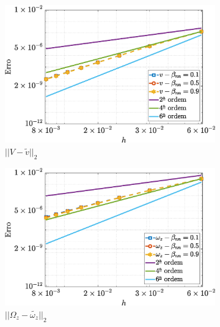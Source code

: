 \begin{figure}[H]
\begin{subfigure}[b]{.47\textwidth}
        \includegraphics[width=\textwidth]{figures/Case12/Giesekus/Errors/NormErr_2nd_Re_100_Wi_1_epsilon_0_xi_0_alphaG_0.1_Dt_1e-06_at_0.05_tipsim_1_MMS_12_V.eps}
        \caption{$||V - \widetilde{v}||_{2}$}
        \label{error_v_2nd_Case1_giesekus_alphaG_0.5}
    \end{subfigure}
    \qquad
    \begin{subfigure}[b]{.47\textwidth}
        \includegraphics[width=\textwidth]{figures/Case12/Giesekus/Errors/NormErr_2nd_Re_100_Wi_1_epsilon_0_xi_0_alphaG_0.1_Dt_1e-06_at_0.05_tipsim_1_MMS_12_Wz.eps}
        \caption{$||\Omega_{z} - \widetilde{\omega_{z}}||_{2}$}
        \label{error_wz_2nd_Case1_giesekus_alphaG_0.5}
    \end{subfigure}
    \qquad
    \begin{subfigure}[b]{.47\textwidth}

\end{subfigure}
\end{figure}
